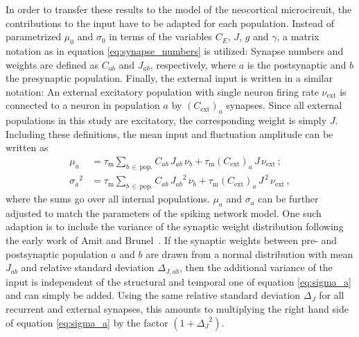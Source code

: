 In order to transfer these results to the model of the neocortical microcircuit, 
the contributions to the input have to be adapted for each population. Instead of 
parametrized $\mu_0$ and $\sigma_0$ in terms of the variables $C_E$, $J$, $g$ and $\gamma$, 
a matrix notation as in equation \eqref{eq:synapse_numbers} is utilized: 
Synapse numbers and weights are defined as $C_{ab}$ and $J_{ab}$, respectively, 
where $a$ is the postsynaptic and $b$ the presynaptic population. 
Finally, the external input is written in a similar notation: 
An external excitatory population with single neuron firing rate $\nu_\text{ext}$ 
is connected to a neuron in population $a$ by 
$(C_\text{ext})_a$ synapses. Since all external populations in this study are 
excitatory, the corresponding weight is simply $J$.
Including these definitions, the mean input and fluctuation amplitude can 
be written as 
\begin{align}
    \label{eq:mu_a}
    \mu_a        &= 
        \tau_\text{m} \sum_{b \,\in \,\text{pop.}} C_{ab} \, J_{ab} \, \nu_b 
        + \tau_\text{m} (C_\text{ext})_a \, J \, \nu_\text{ext} \, ; \\
    \label{eq:sigma_a}
    {\sigma_a}^2 &= 
        \tau_\text{m} \sum_{b \,\in \,\text{pop.}} C_{ab} \, {J_{ab}}^2  \, \nu_b
        + \tau_\text{m} (C_\text{ext})_a \,J^{\,2} \,\nu_\text{ext}\,,
\end{align}
where the sums go over all internal populations. 
$\mu_a$ and $\sigma_a$ can be further adjusted to match the parameters of the spiking network 
model. One such adaption is to include the variance of the synaptic weight distribution 
following the early work of Amit and Brunel~\cite{amit1997model}. 
If the synaptic weights between pre- and postsynaptic population $a$ and $b$ are drawn
from a normal distribution with mean $J_{ab}$ and relative standard deviation $\Delta_{J, ab}$, 
then the additional variance of the input is independent of the structural and temporal one
of equation \eqref{eq:sigma_a} and can simply be added. Using the same relative standard deviation 
$\Delta_J$ for all recurrent and external synapses, this amounts to multiplying the right 
hand side of equation \eqref{eq:sigma_a} by the factor $(1 + {\Delta_J}^2)$.

